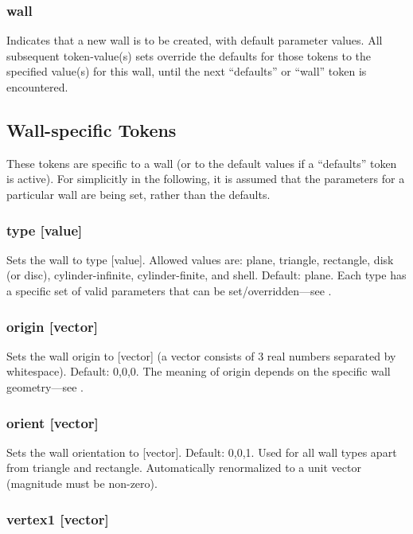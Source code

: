 \subsubsection{wall}

Indicates that a new wall is to be created, with default parameter
values.  All subsequent token-value(s) sets override the defaults for
those tokens to the specified value(s) for this wall, until the next
``defaults'' or ``wall'' token is encountered.

\subsection{Wall-specific Tokens}

These tokens are specific to a wall (or to the default values if a
``defaults'' token is active).  For simplicitly in the following, it
is assumed that the parameters for a particular wall are being set,
rather than the defaults.

\subsubsection{type [value]}

Sets the wall to type [value].  Allowed values are: plane, triangle,
rectangle, disk (or disc), cylinder-infinite, cylinder-finite, and
shell.  Default: plane.  Each type has a specific set of valid
parameters that can be set/overridden---see .

\subsubsection{origin [vector]}

Sets the wall origin to [vector] (a vector consists of 3 real numbers
separated by whitespace).  Default: 0,0,0.  The meaning of origin
depends on the specific wall geometry---see .

\subsubsection{orient [vector]}

Sets the wall orientation to [vector].  Default: 0,0,1.  Used for all
wall types apart from triangle and rectangle.  Automatically
renormalized to a unit vector (magnitude must be non-zero).

\subsubsection{vertex1 [vector]}

